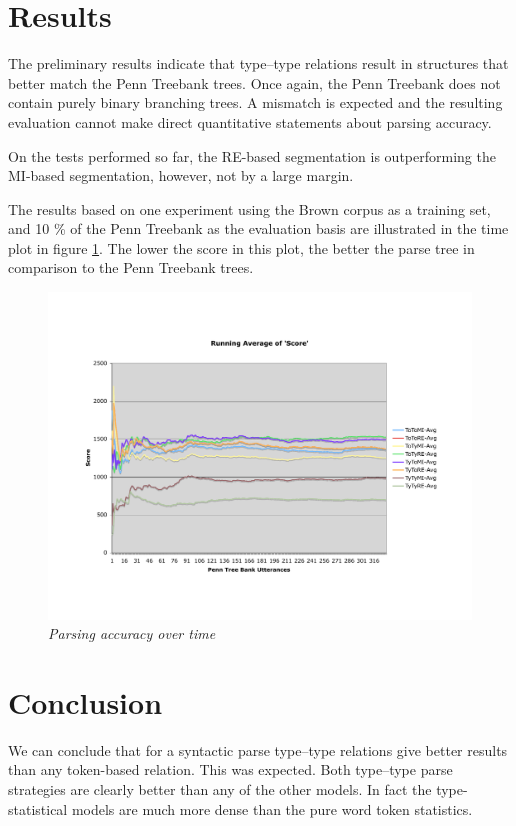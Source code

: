 \documentclass[11pt,a4paper,english]{article}
\begin{document}
\section{Results}

The preliminary results indicate that type--type relations result in structures that better match the Penn Treebank trees. Once again, the Penn Treebank does not contain purely binary branching trees. A mismatch is expected and the resulting evaluation cannot make direct quantitative statements about parsing accuracy.

On the tests performed so far, the RE-based segmentation is outperforming the MI-based segmentation, however, not by a large margin.

The results based on one experiment using the Brown corpus as a training set, and 10 \% of the Penn Treebank as the evaluation basis are illustrated in the time plot in figure \ref{Fig:ParseAcc}. The lower the score in this plot, the better the parse tree in comparison to the Penn Treebank trees.

\begin{figure}[h]
\centering
\includegraphics[scale=0.55]{mip-cut-results.pdf}
\caption{\emph{Parsing accuracy over time}\label{Fig:ParseAcc}}
\end{figure}


\section{Conclusion}\label{Sec:Conclusions}

We can conclude that for a syntactic parse type--type relations give better results than any token-based relation. This was expected. Both type--type parse strategies are clearly better than any of the other models. In fact the type-statistical models are much more dense than the pure word token statistics.
\end{document}
